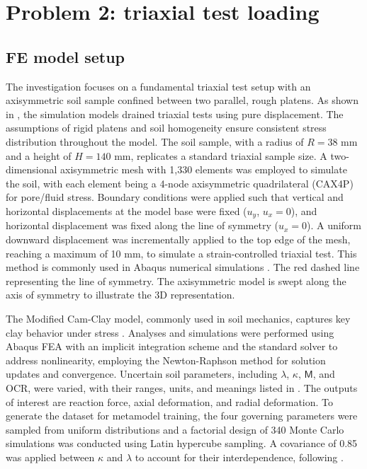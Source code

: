 \section{Problem 2: triaxial test loading}\label{sec:example2}\noindent
\subsection{FE model setup}\noindent
The investigation focuses on a fundamental triaxial test setup with an axisymmetric soil sample confined between two parallel, rough platens. As shown in , the simulation models drained triaxial tests using pure displacement. The assumptions of rigid platens and soil homogeneity ensure consistent stress distribution throughout the model. The soil sample, with a radius of $R = 38$ mm and a height of $H = 140$ mm, replicates a standard triaxial sample size. A two-dimensional axisymmetric mesh with 1,330 elements was employed to simulate the soil, with each element being a 4-node axisymmetric quadrilateral (CAX4P) for pore/fluid stress. Boundary conditions were applied such that vertical and horizontal displacements at the model base were fixed ($u_y$, $u_x = 0$), and horizontal displacement was fixed along the line of symmetry ($u_x = 0$). A uniform downward displacement was incrementally applied to the top edge of the mesh, reaching a maximum of 10 mm, to simulate a strain-controlled triaxial test. This method is commonly used in Abaqus numerical simulations \parencite{helwany2007, Matthew2024}. The red dashed line representing the line of symmetry. The axisymmetric model is swept along the axis of symmetry to illustrate the 3D representation. 



The Modified Cam-Clay model, commonly used in soil mechanics, captures key clay behavior under stress \parencite{roscoe1968}. Analyses and simulations were performed using Abaqus FEA with an implicit integration scheme and the standard solver to address nonlinearity, employing the Newton-Raphson method for solution updates and convergence. Uncertain soil parameters, including $\lambda$, $\kappa$, $\mathsf{M}$, and OCR, were varied, with their ranges, units, and meanings listed in . The outputs of interest are reaction force, axial deformation, and radial deformation. To generate the dataset for metamodel training, the four governing parameters were sampled from uniform distributions and a factorial design of 340 Monte Carlo simulations was conducted using Latin hypercube sampling. A covariance of 0.85 was applied between $\kappa$ and $\lambda$ to account for their interdependence, following \parencite{Matthew2024,dawood2025}.

